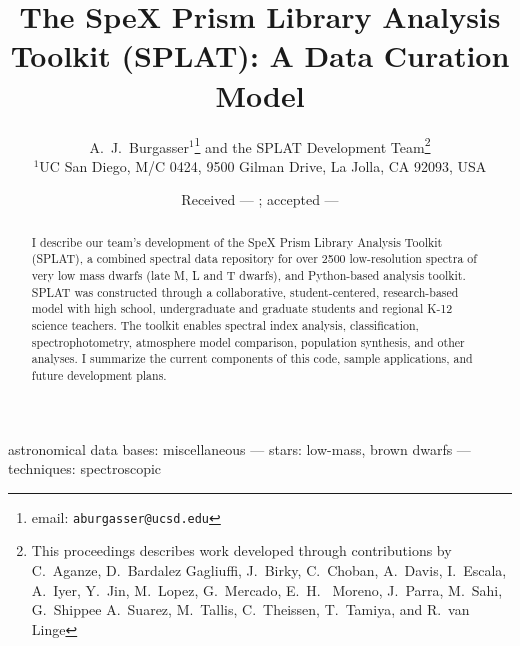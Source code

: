 \documentclass[usenatbib]{basi}
\begin{document}
%
\title[SPLAT]{The SpeX Prism Library Analysis Toolkit (SPLAT): A Data Curation Model}
%
\author[A.~J.~Burgasser]%
       {A.~J.~Burgasser$^1$\thanks{email: \texttt{aburgasser@ucsd.edu}} 
       and the SPLAT Development Team\thanks{This proceedings describes work developed through contributions by C.~Aganze, D.~Bardalez Gagliuffi, J.~Birky, C.~Choban, A.~Davis, I.~Escala, A.~Iyer,       Y.~Jin,       M.~Lopez,      G.~Mercado,       E.~H.~ Moreno,       J.~Parra,       M.~Sahi,       G.~Shippee       A.~Suarez,       M.~Tallis,       C.~Theissen,       T.~Tamiya, and   R.~van Linge}\\
       $^1$UC San Diego, M/C 0424, 9500 Gilman Drive, La Jolla, CA 92093, USA\\
       }
\pagerange{\pageref{firstpage}--\pageref{lastpage}}

\date{Received --- ; accepted ---}

\maketitle
\label{firstpage}

\begin{abstract}
%
I describe our team's development of the SpeX Prism Library Analysis Toolkit (SPLAT), a combined spectral data repository for over 2500 low-resolution spectra of very low mass dwarfs (late M, L and T dwarfs), and Python-based analysis toolkit. SPLAT was constructed through a collaborative, student-centered, research-based model with high school, undergraduate and graduate students and regional K-12 science teachers. The toolkit enables spectral index analysis, classification, spectrophotometry, atmosphere model comparison, population synthesis, and other analyses. I summarize the current components of this code, sample applications, and future development plans. 
\end{abstract}

\begin{keywords}
   astronomical data bases: miscellaneous --- stars: low-mass, brown dwarfs --- techniques: spectroscopic

\end{keywords}
\end{document}
